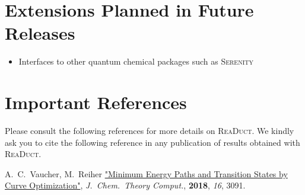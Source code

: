 \documentclass[]{tufte-book}
\begin{document}
\chapter{Extensions Planned in Future Releases}
\begin{itemize}
\item Interfaces to other quantum chemical packages such as \textsc{Serenity}\cite{serenity}
\end{itemize}


\chapter{Important References}

Please consult the following references for more details on \textsc{ReaDuct}.
We kindly ask you to cite the following reference in any publication of results obtained with \textsc{ReaDuct}.
\vspace{1.0cm}

A.~C.~Vaucher, M.~Reiher \href{https://pubs.acs.org/doi/10.1021/acs.jctc.8b00169}{"Minimum Energy Paths and Transition States by Curve Optimization"}, \textit{J.~Chem.~Theory Comput.}, \textbf{2018}, \textit{16}, 3091.




\backmatter




\end{document}
